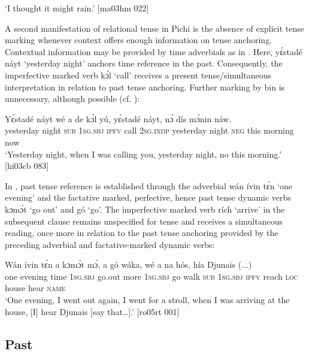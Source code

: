\glt ‘I thought it might rain.’ [ma03hm 022]
\z

A second manifestation of relational tense in Pichi is the absence of explicit tense marking whenever context offers enough information on tense anchoring. Contextual information may be provided by time adverbials as in . Here, yɛ́stadé náyt ‘yesterday night’ anchors time reference in the past. Consequently, the imperfective marked verb kɔ́l ‘call’ receives a present tense/simultaneous interpretation in relation to past tense anchoring. Further marking by bin is unnecessary, although possible (cf. ):


\ea%
    \label{ex:key:376}
    \gll Yɛ́stadé    náyt  wé  a    de  kɔ́l  yú,    yɛ́stadé    náyt,
nɔ́  dís  mɔ́nin  náw.\\
yesterday  night  \textsc{sub}  \textsc{1sg.sbj}  \textsc{ipfv}  call  \textsc{2sg.indp}  yesterday  night
\textsc{neg}  this  morning  now\\

\glt ‘Yesterday night, when I was calling you, yesterday night,
no this morning.’ [hi03cb 083]
\z

In , past tense reference is established through the adverbial wán ívin tɛ́n ‘one evening’ and the factative marked, perfective, hence past tense dynamic verbs kɔmɔ́t ‘go out’ and gó ‘go’. The imperfective marked verb rích ‘arrive’ in the subsequent clause remains unspecified for tense and receives a simultaneous reading, once more in relation to the past tense anchoring provided by the preceding adverbial and factative-marked dynamic verbs:


\ea%
    \label{ex:key:377}
    \gll Wán    ívin    tɛ́n    a    kɔmɔ́t  mɔ́,    a    gó  wáka,
wé  a        na  hós,    hía    Djunais  (...)\\
one    evening  time    \textsc{1sg.sbj}  go.out  more  \textsc{1sg.sbj}  go  walk
\textsc{sub}  \textsc{1sg.sbj}  \textsc{ipfv}  reach  \textsc{loc}  house  hear    \textsc{name}\\

\glt ‘One evening, I went out again, I went for a stroll, when I was arriving 
at the house, [I] hear Djunais [say that…].’ [ro05rt 001]
\z

\subsection{Past}\label{sec:6.5.2}

